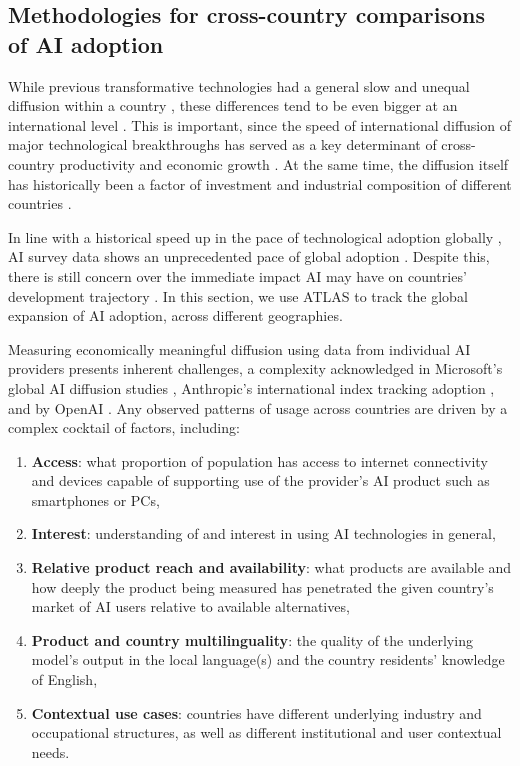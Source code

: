 \documentclass[11pt,a4paper]{article}
\begin{document}
\subsection{Methodologies for cross-country comparisons of AI adoption}

While previous transformative technologies had a general slow and unequal diffusion within a country \citep{KalyaniQJE}, these differences tend to be even bigger at an international level \citep{10.1257/aer.100.5.2031}. This is important, since the speed of international diffusion of major technological breakthroughs has served as a key determinant of cross-country productivity and economic growth \citep{1929ccba-ba3a-3051-b4bc-b696bde37fcf, repec:eee:grochp:2-565}. At the same time, the diffusion itself has historically been a factor of investment and industrial composition of different countries \citep{10.1257/aer.91.2.328, 10.1257/0022051042177685}.

In line with a historical speed up in the pace of technological adoption globally \citep[e.g.,][]{Hobijn2003}, AI survey data shows an unprecedented pace of global adoption \citep{Bick2026, sajadieh2026}. Despite this, there is still concern over the immediate impact AI may have on countries’ development trajectory \citep[e.g.,][]{NBERw28453, Cerutti2025Global}. In this section, we use ATLAS to track the global expansion of AI adoption, across different geographies.

Measuring economically meaningful diffusion using data from individual AI providers presents inherent challenges, a complexity acknowledged in Microsoft's global AI diffusion studies \citep[e.g.,][]{misra2025measuringaidiffusionpopulationnormalized, misra2026aidiffusion}, Anthropic's international index tracking adoption \citep[e.g.,][]{appelmccrorytamkin2025geoapi}, and by OpenAI \citep[e.g.,][]{NBERw34255}. Any observed patterns of usage across countries are driven by a complex cocktail of factors, including:

\begin{enumerate}
    \item \textbf{Access}: what proportion of population has access to internet connectivity and devices capable of supporting use of the provider’s AI product such as smartphones or PCs,
    \item \textbf{Interest}: understanding of and interest in using AI technologies in general,
    \item \textbf{Relative product reach and availability}: what products are available and how deeply the product being measured has penetrated the given country’s market of AI users relative to available alternatives,
    \item \textbf{Product and country multilinguality}: the quality of the underlying model’s output in the local language(s) and the country residents’ knowledge of English,
    \item \textbf{Contextual use cases}: countries have different underlying industry and occupational structures, as well as different institutional and user contextual needs.
\end{enumerate}
\end{document}

